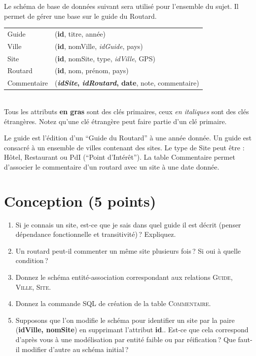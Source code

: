 


Le schéma de base de données suivant sera utilisé pour l'ensemble du
sujet. Il permet de gérer une base sur le guide du Routard.

\begin{tabular}{ll}
{\sc Guide} &(\textbf{id}, titre, année)\\
{\sc Ville} &(\textbf{id}, nomVille, \textit{idGuide}, pays)\\
{\sc Site} &(\textbf{id}, nomSite, type, \textit{idVille}, GPS)\\
{\sc Routard} &(\textbf{id}, nom, prénom, pays)\\
{\sc Commentaire} &(\textbf{\textit{idSite}, \textit{idRoutard}, date}, note, commentaire)
\end{tabular}\\

Tous les attributs \textbf{en gras}
sont des clés primaires, ceux \textit{en italiques} sont des clés étrangères. Notez
qu'une clé étrangère peut faire partie d'un clé primaire.

Le {\sc guide} est l'édition d'un ``Guide du Routard'' 
à une année donnée. Un guide est consacré à un ensemble de villes contenant des sites.
Le type de {\sc Site} peut être : Hôtel, Restaurant ou PdI (``Point d'Intérêt'').
La table {\sc Commentaire} permet d'associer le commentaire d'un routard avec 
un site à une date donnée. 

\section{Conception (5 points)}

\begin{enumerate}
    \item Si je connais un site, est-ce que je sais dans quel guide il est décrit (penser dépendance fonctionnelle
    et transitivité)\,? Expliquez.
    \item Un routard peut-il commenter un même site plusieurs fois\,? Si oui à quelle condition\,?
     \item Donnez le schéma entité-association correspondant aux relations \textsc{Guide}, \textsc{Ville},
          \textsc{Site}.
     \item Donnez la commande SQL de création de la table \textsc{Commentaire}.
     \item Supposons que l'on  modifie le schéma pour identifier un site par la paire (\textbf{idVille, nomSite})
     en supprimant l'attribut \textbf{id}..
             Est-ce que cela correspond d'après vous à une modélisation par entité faible ou
             par réification\,? Que faut-il modifier d'autre au schéma initial\,?
\end{enumerate}


